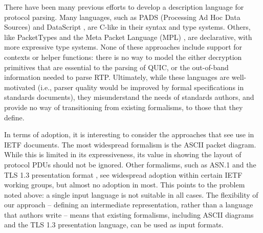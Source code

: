 \documentclass[10pt,sigconf]{acmart}
\begin{document}
%
% 

There have been many previous efforts to develop a description language for protocol
parsing. Many languages, such as PADS (Processing Ad Hoc Data Sources)
\cite{fisher2005pads} and DataScript \cite{back2002datascript}, are C-like in their syntax
and type systems. Others, like PacketTypes \cite{mccann2000packet} and the Meta Packet
Language (MPL) \cite{madhavapeddy2007melange}, are declarative, with more expressive type
systems. None of these approaches include support for contexts or helper functions: there
is no way to model the either decryption primitives that are essential to the parsing of
QUIC, or the out-of-band information needed to parse RTP. Ultimately, while these
languages are well-motivated (i.e., parser quality would be improved by formal
specifications in standards documents), they misunderstand the needs of standards authors,
and provide no way of transitioning from existing formalisms, to those that they define.

In terms of adoption, it is interesting to consider the approaches that see use in IETF
documents. The most widespread formalism is the ASCII packet diagram. While this is
limited in its expressiveness, its value in showing the layout of protocol PDUs should not
be ignored. Other formalisms, such as ASN.1 \cite{x680} and the TLS 1.3 presentation
format \cite{draft-ietf-tls-tls13-28}, see widespread adoption within certain IETF
working groups, but almost no adoption in most. This points to the problem noted above: a
single input language is not suitable in all cases. The flexibility of our approach --
defining an intermediate representation, rather than a language that authors write -- means
that existing formalisms, including ASCII diagrams and the TLS 1.3 presentation language,
can be used as input formats. 
\end{document}
